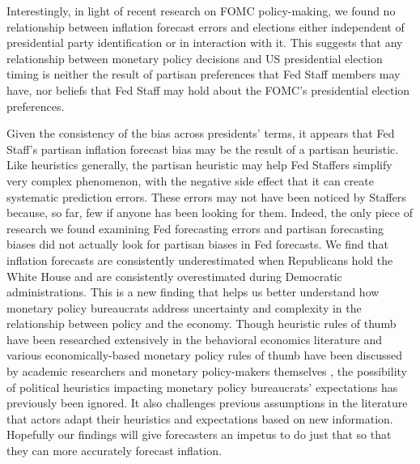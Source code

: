 \documentclass[a4paper]{article}\usepackage[]{graphicx}\usepackage[]{color}
\begin{document}
Interestingly, in light of recent research on FOMC policy-making, we found no relationship between inflation forecast errors and elections either independent of presidential party identification or in interaction with it. This suggests that any relationship between monetary policy decisions and US presidential election timing is neither the result of partisan preferences that Fed Staff members may have, nor beliefs that Fed Staff may hold about the FOMC's presidential election preferences. 

Given the consistency of the bias across presidents' terms, it appears that Fed Staff's partisan inflation forecast bias may be the result of a partisan heuristic. Like heuristics generally, the partisan heuristic may help Fed Staffers simplify very complex phenomenon, with the negative side effect that it can create systematic prediction errors. These errors may not have been noticed by Staffers because, so far, few if anyone has been looking for them. Indeed, the only piece of research we found examining Fed forecasting errors and partisan forecasting biases \cite[i.e.][]{Frendreis2000} did not actually look for partisan biases in Fed forecasts. We find that inflation forecasts are consistently underestimated when Republicans hold the White House and are consistently overestimated during Democratic administrations. This is a new finding that helps us better understand how monetary policy bureaucrats address uncertainty and complexity in the relationship between policy and the economy. Though heuristic rules of thumb have been researched extensively in the behavioral economics literature \citep[e.g.][]{kahneman1973, tverskykahneman1974, kahneman2003} and various economically-based monetary policy rules of thumb have been discussed by academic researchers and monetary policy-makers themselves \cite[e.g.][]{McNees1990,Orphanides2008}, the possibility of political heuristics impacting monetary policy bureaucrats’ expectations has previously been ignored. It also challenges previous assumptions in the literature \cite[see in particular][]{Grauwe2011} that actors adapt their heuristics and expectations based on new information. Hopefully our findings will give forecasters an impetus to do just that so that they can more accurately forecast inflation.
\end{document}
